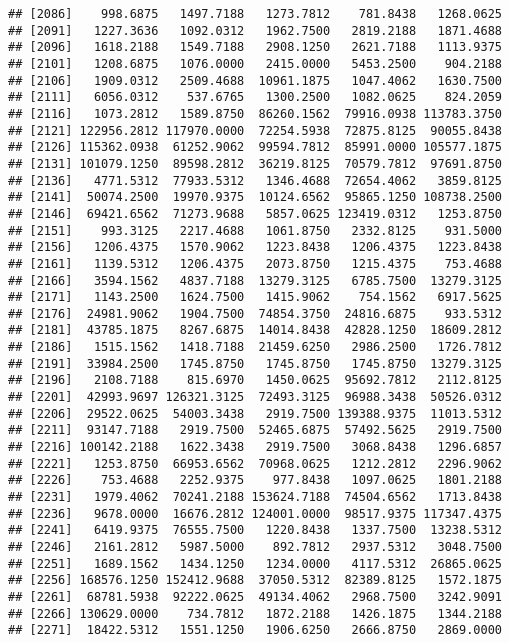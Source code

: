 \documentclass[]{article}
\begin{document}
\begin{verbatim}
## [2086]    998.6875   1497.7188   1273.7812    781.8438   1268.0625
## [2091]   1227.3636   1092.0312   1962.7500   2819.2188   1871.4688
## [2096]   1618.2188   1549.7188   2908.1250   2621.7188   1113.9375
## [2101]   1208.6875   1076.0000   2415.0000   5453.2500    904.2188
## [2106]   1909.0312   2509.4688  10961.1875   1047.4062   1630.7500
## [2111]   6056.0312    537.6765   1300.2500   1082.0625    824.2059
## [2116]   1073.2812   1589.8750  86260.1562  79916.0938 113783.3750
## [2121] 122956.2812 117970.0000  72254.5938  72875.8125  90055.8438
## [2126] 115362.0938  61252.9062  99594.7812  85991.0000 105577.1875
## [2131] 101079.1250  89598.2812  36219.8125  70579.7812  97691.8750
## [2136]   4771.5312  77933.5312   1346.4688  72654.4062   3859.8125
## [2141]  50074.2500  19970.9375  10124.6562  95865.1250 108738.2500
## [2146]  69421.6562  71273.9688   5857.0625 123419.0312   1253.8750
## [2151]    993.3125   2217.4688   1061.8750   2332.8125    931.5000
## [2156]   1206.4375   1570.9062   1223.8438   1206.4375   1223.8438
## [2161]   1139.5312   1206.4375   2073.8750   1215.4375    753.4688
## [2166]   3594.1562   4837.7188  13279.3125   6785.7500  13279.3125
## [2171]   1143.2500   1624.7500   1415.9062    754.1562   6917.5625
## [2176]  24981.9062   1904.7500  74854.3750  24816.6875    933.5312
## [2181]  43785.1875   8267.6875  14014.8438  42828.1250  18609.2812
## [2186]   1515.1562   1418.7188  21459.6250   2986.2500   1726.7812
## [2191]  33984.2500   1745.8750   1745.8750   1745.8750  13279.3125
## [2196]   2108.7188    815.6970   1450.0625  95692.7812   2112.8125
## [2201]  42993.9697 126321.3125  72493.3125  96988.3438  50526.0312
## [2206]  29522.0625  54003.3438   2919.7500 139388.9375  11013.5312
## [2211]  93147.7188   2919.7500  52465.6875  57492.5625   2919.7500
## [2216] 100142.2188   1622.3438   2919.7500   3068.8438   1296.6857
## [2221]   1253.8750  66953.6562  70968.0625   1212.2812   2296.9062
## [2226]    753.4688   2252.9375    977.8438   1097.0625   1801.2188
## [2231]   1979.4062  70241.2188 153624.7188  74504.6562   1713.8438
## [2236]   9678.0000  16676.2812 124001.0000  98517.9375 117347.4375
## [2241]   6419.9375  76555.7500   1220.8438   1337.7500  13238.5312
## [2246]   2161.2812   5987.5000    892.7812   2937.5312   3048.7500
## [2251]   1689.1562   1434.1250   1234.0000   4117.5312  26865.0625
## [2256] 168576.1250 152412.9688  37050.5312  82389.8125   1572.1875
## [2261]  68781.5938  92222.0625  49134.4062   2968.7500   3242.9091
## [2266] 130629.0000    734.7812   1872.2188   1426.1875   1344.2188
## [2271]  18422.5312   1551.1250   1906.6250   2666.8750   2869.0000

\end{verbatim}
\end{document}
